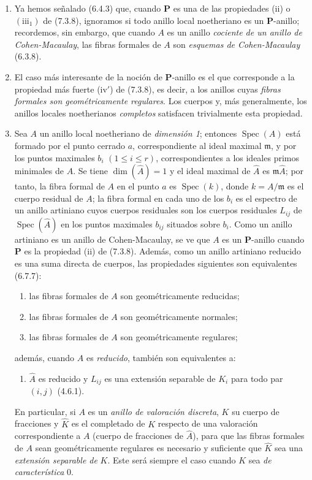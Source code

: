 \begin{remarks}[7.3.19]
\begin{enumerate}
\item[\textup{(ii)}] Ya hemos señalado (6.4.3) que, cuando
$\boldsymbol P$ es una de las propiedades (ii) o
$(\mathrm{iii}_1)$ de (7.3.8), ignoramos si todo anillo local
noetheriano es un $\boldsymbol P$-anillo; recordemos, sin embargo,
que cuando $A$ es un anillo \emph{cociente de un anillo de
Cohen-Macaulay}, las fibras formales de $A$ son \emph{esquemas de
Cohen-Macaulay} (6.3.8).
\item[\textup{(iii)}] El caso más interesante de la noción de
$\boldsymbol P$-anillo es el que corresponde a la propiedad más
fuerte (iv$'$) de (7.3.8), es decir, a los anillos cuyas
\emph{fibras formales son geométricamente regulares}. Los cuerpos y,
más generalmente, los anillos locales noetherianos \emph{completos}
satisfacen trivialmente esta propiedad.
\item[\textup{(iv)}] Sea $A$ un anillo local noetheriano de
\emph{dimensión 1}; entonces $\operatorname{Spec}(A)$ está formado
por el punto cerrado $a$, correspondiente al ideal maximal
$\mathfrak m$, y por los puntos maximales $b_i$
$(1\leqslant i\leqslant r)$, correspondientes a los ideales primos
minimales de $A$. Se tiene $\dim(\widehat A)=1$ y el ideal maximal
de $\widehat A$ es $\mathfrak m\widehat A$; por tanto, la fibra
formal de $A$ en el punto $a$ es $\operatorname{Spec}(k)$, donde
$k=A/\mathfrak m$ es el cuerpo residual de $A$; la fibra formal
en cada uno de los $b_i$ es el espectro de un anillo artiniano
cuyos cuerpos residuales son los cuerpos residuales $L_{ij}$ de
$\operatorname{Spec}(\widehat A)$ en los puntos maximales $b_{ij}$
situados sobre $b_i$. Como un anillo artiniano es un anillo de
Cohen-Macaulay, se ve que $A$ es un $\boldsymbol P$-anillo cuando
$\boldsymbol P$ es la propiedad (ii) de (7.3.8). Además, como un
anillo artiniano reducido es una suma directa de cuerpos, las
propiedades siguientes son equivalentes (6.7.7):
\begin{enumerate}
\item[\emph{a)}] las fibras formales de $A$ son geométricamente
reducidas;
\item[\emph{b)}] las fibras formales de $A$ son geométricamente
normales;
\item[\emph{c)}] las fibras formales de $A$ son geométricamente
regulares;
\end{enumerate}
además, cuando $A$ es \emph{reducido}, también son equivalentes a:
\begin{enumerate}
\item[\emph{d)}] $\widehat A$ es reducido y $L_{ij}$ es una
extensión separable de $K_i$ para todo par $(i,j)$ (4.6.1).
\end{enumerate}
En particular, si $A$ es un \emph{anillo de valoración discreta},
$K$ su cuerpo de fracciones y $\widehat K$ es el completado de $K$
respecto de una valoración correspondiente a $A$ (cuerpo de
fracciones de $\widehat A$), para que las fibras formales de $A$
sean geométricamente regulares es necesario y suficiente que
$\widehat K$ sea una \emph{extensión separable de} $K$. Este será
siempre el caso cuando $K$ sea \emph{de característica} 0.
\end{enumerate}
\end{remarks}
